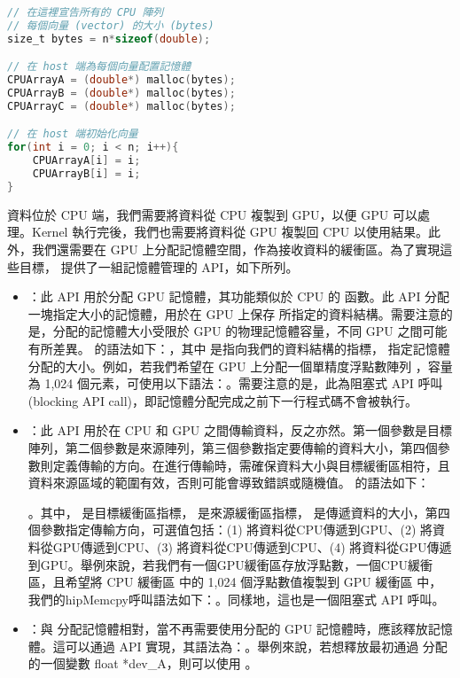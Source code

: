 \begin{lstlisting}[language=C, caption={CPU的記憶體配置}, label={5th:example}]
// 在這裡宣告所有的 CPU 陣列
// 每個向量 (vector) 的大小 (bytes)
size_t bytes = n*sizeof(double);

// 在 host 端為每個向量配置記憶體
CPUArrayA = (double*) malloc(bytes);
CPUArrayB = (double*) malloc(bytes);
CPUArrayC = (double*) malloc(bytes);

// 在 host 端初始化向量
for(int i = 0; i < n; i++){
    CPUArrayA[i] = i;
    CPUArrayB[i] = i;
}
\end{lstlisting}

資料位於 CPU 端，我們需要將資料從 CPU 複製到 GPU，以便 GPU 可以處理。Kernel 執行完後，我們也需要將資料從 GPU 複製回 CPU 以使用結果。此外，我們還需要在 GPU 上分配記憶體空間，作為接收資料的緩衝區。為了實現這些目標， 提供了一組記憶體管理的 API，如下所列。

\begin{itemize}
    \item {}：此 API 用於分配 GPU 記憶體，其功能類似於 CPU 的  函數。此 API 分配一塊指定大小的記憶體，用於在 GPU 上保存  所指定的資料結構。需要注意的是，分配的記憶體大小受限於 GPU 的物理記憶體容量，不同 GPU 之間可能有所差異。 的語法如下：，其中  是指向我們的資料結構的指標， 指定記憶體分配的大小。例如，若我們希望在 GPU 上分配一個單精度浮點數陣列 ，容量為 1,024 個元素，可使用以下語法：。需要注意的是，此為阻塞式 API 呼叫 (blocking API call)，即記憶體分配完成之前下一行程式碼不會被執行。
    \item {}：此 API 用於在 CPU 和 GPU 之間傳輸資料，反之亦然。第一個參數是目標陣列，第二個參數是來源陣列，第三個參數指定要傳輸的資料大小，第四個參數則定義傳輸的方向。在進行傳輸時，需確保資料大小與目標緩衝區相符，且資料來源區域的範圍有效，否則可能會導致錯誤或隨機值。 的語法如下：
    
    。其中， 是目標緩衝區指標， 是來源緩衝區指標， 是傳遞資料的大小，第四個參數指定傳輸方向，可選值包括：(1)  將資料從CPU傳遞到GPU、(2)  將資料從GPU傳遞到CPU、(3)  將資料從CPU傳遞到CPU、(4)  將資料從GPU傳遞到GPU。舉例來說，若我們有一個GPU緩衝區存放浮點數，一個CPU緩衝區，且希望將 CPU 緩衝區  中的 1,024 個浮點數值複製到 GPU 緩衝區  中，我們的hipMemcpy呼叫語法如下：。同樣地，這也是一個阻塞式 API 呼叫。
    \item {}：與  分配記憶體相對，當不再需要使用分配的 GPU 記憶體時，應該釋放記憶體。這可以通過  API 實現，其語法為：。舉例來說，若想釋放最初通過  分配的一個變數 float *dev\_A，則可以使用 。
\end{itemize}

